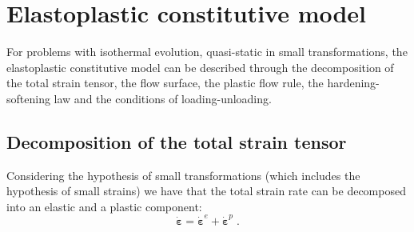 \documentclass[Journal,letterpaper]{ascelike-new}
\newcommand{\dstrain}{\boldsymbol{\dot{\varepsilon}}}
\newcommand{\dstraine}{\boldsymbol{\dot{\varepsilon}}^{e}}
\newcommand{\dstrainp}{\boldsymbol{\dot{\varepsilon}}^{p}}
\begin{document}



\section{Elastoplastic constitutive model}

For problems with isothermal evolution, quasi-static in small transformations, the elastoplastic constitutive model can be described through the decomposition of the total strain tensor, the flow surface, the plastic flow rule, the hardening-softening law and the conditions of loading-unloading.

\subsection{Decomposition of the total strain tensor}

Considering the hypothesis of small transformations (which includes the hypothesis of small strains) we have that the total strain rate can be decomposed into an elastic and a plastic component:
\begin{equation} \label{eq_decomposition_plastic}
    \dstrain=\dstraine + \dstrainp\;.
\end{equation}
\end{document}
